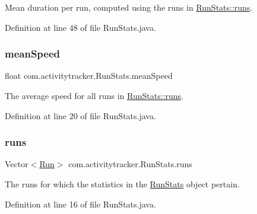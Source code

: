 Mean duration per run, computed using the runs in \mbox{\hyperlink{classcom_1_1activitytracker_1_1_run_stats_a0fd429e9f463ddf4897c507c0e3c0a12}{Run\+Stats\+::runs}}. 

Definition at line 48 of file Run\+Stats.\+java.

\mbox{\label{classcom_1_1activitytracker_1_1_run_stats_a64b9e6daf2be19571b8ad401922762c2}} 
\subsubsection{\texorpdfstring{mean\+Speed}{meanSpeed}}
{\footnotesize\ttfamily float com.\+activitytracker.\+Run\+Stats.\+mean\+Speed\hspace{0.3cm}{\ttfamily [package]}}

The average speed for all runs in \mbox{\hyperlink{classcom_1_1activitytracker_1_1_run_stats_a0fd429e9f463ddf4897c507c0e3c0a12}{Run\+Stats\+::runs}}. 

Definition at line 20 of file Run\+Stats.\+java.

\mbox{\label{classcom_1_1activitytracker_1_1_run_stats_a0fd429e9f463ddf4897c507c0e3c0a12}} 
\subsubsection{\texorpdfstring{runs}{runs}}
{\footnotesize\ttfamily Vector$<$\mbox{\hyperlink{classcom_1_1activitytracker_1_1_run}{Run}}$>$ com.\+activitytracker.\+Run\+Stats.\+runs\hspace{0.3cm}{\ttfamily [package]}}

The runs for which the statistics in the \mbox{\hyperlink{classcom_1_1activitytracker_1_1_run_stats}{Run\+Stats}} object pertain. 

Definition at line 16 of file Run\+Stats.\+java.

\mbox{\label{classcom_1_1activitytracker_1_1_run_stats_a1108dd2b031415da72508a5172335dd4}} 
